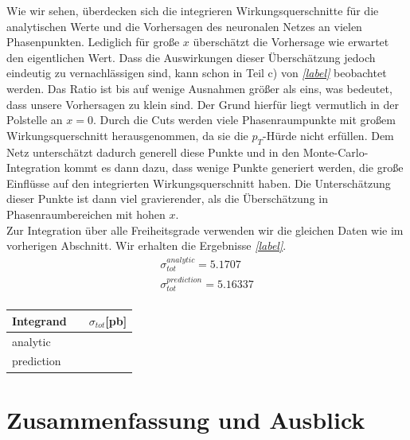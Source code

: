 Wie wir sehen, überdecken sich die integrieren Wirkungsquerschnitte für die analytischen Werte und die Vorhersagen des neuronalen Netzes an vielen Phasenpunkten. Lediglich für große $x$ überschätzt die Vorhersage wie erwartet den eigentlichen Wert. Dass die Auswirkungen dieser Überschätzung jedoch eindeutig zu vernachlässigen sind, kann schon in Teil c) von \textit{\autoref{label}} beobachtet werden. Das Ratio ist bis auf wenige Ausnahmen größer als eins, was bedeutet, dass unsere Vorhersagen zu klein sind. Der Grund hierfür liegt vermutlich in der Polstelle an $x=0$. Durch die Cuts werden viele Phasenraumpunkte mit großem Wirkungsquerschnitt herausgenommen, da sie die $p_T$-Hürde nicht erfüllen. Dem Netz unterschätzt dadurch generell diese Punkte und in den Monte-Carlo-Integration kommt es dann dazu, dass wenige Punkte generiert werden, die große Einflüsse auf den integrierten Wirkungsquerschnitt haben. Die Unterschätzung dieser Punkte ist dann viel gravierender, als die Überschätzung in Phasenraumbereichen mit hohen $x$. \\
\newline
Zur Integration über alle Freiheitsgrade verwenden wir die gleichen Daten wie im vorherigen Abschnitt. Wir erhalten die Ergebnisse \textit{\autoref{label}}.
\begin{equation}
	\begin{split}
	\sigma_{tot}^{analytic} =  5.1707 \\
	\sigma_{tot}^{prediction} = 5.16337\\
	\end{split}
\end{equation}
\begin{table}
	\centering
	\begin{tabular}{lll}
		Integrand & \multicolumn{2}{l}{$\quad \sigma_{tot}$[pb]} \\
		\hline
		analytic & & \\
		prediction & & \\
	\end{tabular}
\end{table}
\chapter{Zusammenfassung und Ausblick}

